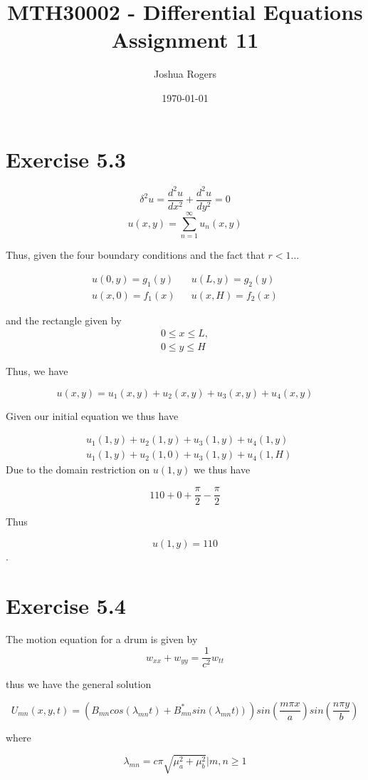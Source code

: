 \documentclass{article}
\title{\vspace{-4cm}MTH30002 - Differential Equations Assignment 11}
\author{Joshua Rogers}
\date\today
\begin{document}
\maketitle

\section*{Exercise 5.3}

$$\delta^2u = \frac{d^2u}{dx^2} + \frac{d^2u}{dy^2} = 0$$
$$u(x,y) = \sum_{n=1}^{\infty} u_n(x,y)$$


Thus, given the four boundary conditions and the fact that $r<1$...

\begin{align*}
u(0,y) = g_1(y) && u(L,y) = g_2(y)\\
u(x,0) = f_1(x) && u(x,H) = f_2(x)
\end{align*}

and the rectangle given by
\begin{align*}
0\leq x \leq L,\\
0 \leq y \leq H
\end{align*}


Thus, we have

$$u(x,y) = u_1(x,y) + u_2(x,y) + u_3(x,y) + u_4(x,y)$$

Given our initial equation we thus have

\begin{align*}
&u_1(1,y) + u_2(1,y) + u_3(1,y) + u_4(1,y) \\
&u_1(1,y) + u_2(1,0) + u_3(1,y) + u_4(1,H)
\end{align*}
Due to the domain restriction on $u(1,y)$ we thus have

$$110 + 0 + \frac{\pi}{2} - \frac{\pi}{2}$$

Thus

$$u(1,y) = 110$$.

\section*{Exercise 5.4}
The motion equation for a drum is given by
$$
w_{xx}+w_{yy}=\frac{1}{c^2}w_{tt}
$$

thus we have the general solution

$$
U_{mn}(x,y,t) = \left(B_{mn}cos(\lambda_{mn}t)+B^{*}_{mn}sin\left(\lambda_{mn}t)\right)\right)sin\left(\frac{m \pi x}{a}\right)sin\left(\frac{n \pi y}{b}\right)
$$

where

$$
\lambda_{mn} = c\pi \sqrt{\mu_a^2 + \mu_b^2}\Bigr| m,n \geq 1
$$
\end{document}
